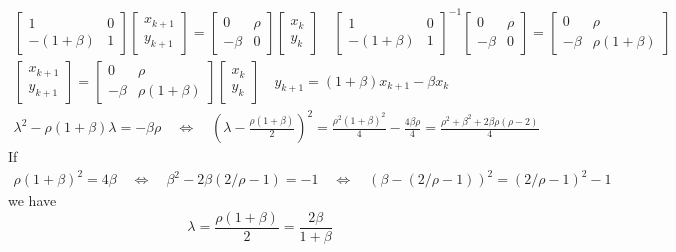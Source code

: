 \documentclass[english,12pt,a4paper]{article}
\begin{document}
%
\begin{align*}
\begin{bmatrix}
1 & 0\\ -(1+\beta)& 1
\end{bmatrix}
\begin{bmatrix}
x_{k+1} \\ y_{k+1}
\end{bmatrix}
=
\begin{bmatrix}
0 & \rho\\ -\beta& 0
\end{bmatrix}
\begin{bmatrix}
x_{k} \\ y_{k}
\end{bmatrix}
\quad
\begin{bmatrix}
1 & 0\\ -(1+\beta)& 1
\end{bmatrix}^{-1}
\begin{bmatrix}
0 & \rho\\ -\beta& 0
\end{bmatrix}
=
\begin{bmatrix}
0 & \rho\\ -\beta& \rho(1+\beta)
\end{bmatrix}\\
\begin{bmatrix}
x_{k+1} \\ y_{k+1}
\end{bmatrix}
=
\begin{bmatrix}
0 & \rho\\ -\beta& \rho(1+\beta)
\end{bmatrix}
\begin{bmatrix}
x_{k} \\ y_{k}
\end{bmatrix}
\quad
y_{k+1} = (1+\beta)x_{k+1} - \beta x_{k}
\end{align*}
%
\begin{align*}
\lambda^2 - \rho(1+\beta)\lambda = -\beta\rho \quad\Leftrightarrow\quad \left(\lambda - \frac{\rho(1+\beta)}{2}\right)^2=\frac{\rho^2(1+\beta)^2}{4} - \frac{4\beta\rho}{4}=\frac{\rho^2 + \beta^2 +2\beta\rho(\rho-2)}{4}
\end{align*}
%
If
%
\begin{align*}
\rho(1+\beta)^2 = 4\beta \quad\Leftrightarrow\quad \beta^2 -2\beta(2/\rho -1) = -1\quad\Leftrightarrow\quad 
\left(\beta - (2/\rho -1)\right)^2=(2/\rho -1)^2-1
\end{align*}
%
we have
%
\begin{equation}\label{eq:}
\lambda = \frac{\rho(1+\beta)}{2} = \frac{2\beta}{1+\beta}
\end{equation}
%
%
\end{document}
